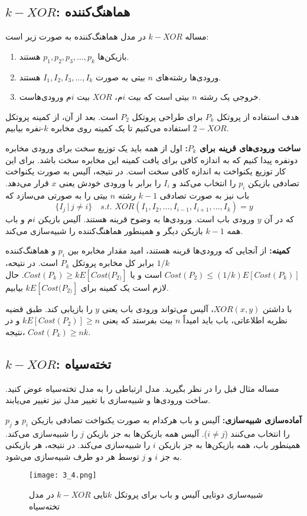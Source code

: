\subsection{$k-XOR$: هماهنگ‌کننده}
مساله $k-XOR$ در مدل هماهنگ‌کننده به صورت زیر است:
\begin{enumerate}
	\item بازیکن‌ها $p_{1},p_{2},p_{3},...,p_{k}$ هستند. 
	\item ورودی‌ها رشته‌های $n$ بیتی به صورت $I_{1},I_{2},I_{3},...,I_{k}$ هستند.
	\item خروجی یک رشته $n$ بیتی است که بیت $i$م، $XOR$ بیت $i$م ورودی‌هاست.
\end{enumerate}
هدف استفاده از پروتکل $P_{k}$ برای طراحی پروتکل $P_{2}$ است. بعد از آن، از کمینه پروتکل $2-XOR$ استفاده می‌کنیم تا یک کمینه روی مخابره $k$-نفره بیابیم. 

\textbf{ساخت ورودی‌های قرینه برای $P_{k}$:} 
اول از همه باید یک توزیع سخت برای ورودی مخابره دونفره پیدا کنیم که به اندازه کافی برای یافت کمینه این مخابره سخت باشد. برای این کار توزیع یکنواخت به اندازه کافی سخت است. در نتیجه، آلیس به صورت یکنواخت تصادفی  بازیکن $p_{i}$ را انتخاب می‌کند و $I_{i}$ را برابر با ورودی خودش یعنی $x$ قرار می‌دهد. باب نیز به صورت تصادفی $k-1$ رشته $n$ بیتی را به صورتی می‌سازد که 
\begin{equation}
	\{I_{j} \, | \, j \ne i \} \quad s.t. \, \, XOR(I_{1},I_{2},...,I_{i-1},I_{i+1},...,I_{k}) = y
\end{equation}
که در آن $y$ ورودی باب است. ورودی‌ها به وضوح قرینه هستند. آلیس بازیکن $i$م و باب همه $k-1$ بازیکن دیگر و همینطور هماهنگ‌کننده را شبیه‌سازی می‌کند.

\textbf{کمینه:}
از آنجایی که ورودی‌ها قرینه هستند، امید مقدار مخابره بین $p_{i}$ و هماهنگ‌کننده $1/k$ برابر کل مخابره پروتکل $P_{k}$ است. در نتیحه، $Cost(P_{2}) \leq (1/k)E[Cost(P_{k})]$ است و یا $Cost(P_{k}) \geq kE[Cost(P_{2)}]$. حال لازم است یک کمینه برای $kE[Cost(P_{2)}]$ بیابیم. 

با داشتن $XOR(x,y)$، آلیس می‌تواند ورودی باب یعنی $y$ را بازیابی کند. طبق قضیه نظریه اطلاعاتی، باب باید امیداً $n$ بیت بفرستد که یعنی $kE[Cost(P_{2})] \geq n$ و در نتیجه، $Cost(P_{k}) \geq nk$.    
\subsection{$k-XOR$: تخته‌سیاه}
مساله مثال قبل را در نظر بگیرید. مدل ارتباطی را به مدل تخته‌سیاه عوض کنید. ساخت ورودی‌ها و شبیه‌سازی با تغییر مدل نیز تغییر می‌یابند. 

\textbf{آماده‌سازی شبیه‌سازی:} 
آلیس و باب هرکدام به صورت یکنواخت تصادفی بازیکن $p_{i}$ و $p_{j}$ را انتخاب می‌کنند ($i \ne j $). آلیس همه‌ بازیکن‌ها به جز بازیکن $j$ را شبیه‌سازی می‌کند. همینطور باب، همه بازیکن‌ها به جز بازیکن $i$ را شبیه‌سازی می‌کند. در نتیجه، هر بازیکنی به جز $i$ و $j$ توسط هر دو طرف شبیه‌سازی می‌شود. 
\begin{figure}[h]
	\caption{شبیه‌سازی دوتایی آلیس و باب برای پروتکل $k$تایی $k-XOR$ در مدل تخته‌سیاه}
	\centering
	\texttt{[image: 3\_4.png]}
\end{figure}


